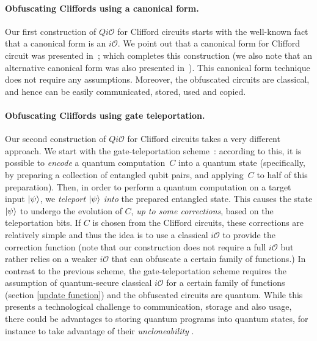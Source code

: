\paragraph{Obfuscating Cliffords using a canonical form.} Our first construction of $Qi\mathcal{O}$ for Clifford circuits starts with the well-known fact that a canonical form is an $i\mathcal{O}$. We point out that a canonical form for Clifford circuit was presented in~\cite{AG04}; which completes this construction (we also note that an alternative canonical form was also presented in~\cite{Sel13arxiv}). This canonical form technique  does not require any assumptions. Moreover, the obfuscated circuits are classical, and hence can be easily communicated, stored, used and copied.

\paragraph{Obfuscating Cliffords using gate teleportation.} Our second construction of $Qi\mathcal{O}$ for Clifford circuits takes a very different approach. We start with the gate-teleportation scheme~\cite{GC99}: according to this, it is possible to \emph{encode} a quantum computation~$C$ into a quantum state (specifically, by preparing a collection of entangled qubit pairs, and applying~$C$ to half of this preparation). Then, in order to perform a quantum computation on a target input ${\lvert}\psi\rangle$, we \emph{teleport} ${\lvert}\psi\rangle$ \emph{into} the prepared entangled state. This causes the state ${\lvert}\psi\rangle$ to undergo the evolution of $C$, \emph{up to some corrections}, based on the teleportation bits. If $C$ is chosen from the Clifford circuits, these corrections are relatively simple and thus the idea is to use a classical  $i\mathcal{O}$ to provide the correction function (note that our construction does not require a full $i\mathcal{O}$ but rather relies on a weaker $i\mathcal{O}$ that can obfuscate a certain family of functions.)
In contrast to the previous scheme, the gate-teleportation scheme requires the assumption of quantum-secure classical $i\mathcal{O}$ for a certain family of functions (section \ref{update function}) and the obfuscated circuits are quantum. While this presents a technological challenge to communication, storage and also usage, there could be advantages to storing quantum programs into quantum states, for instance to take advantage of their \emph{uncloneability} \cite{Aar09,BL19arxiv}.



